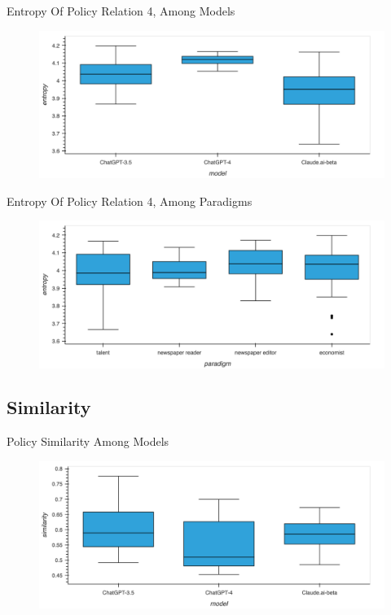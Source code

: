 \documentclass[12pt]{beamer}
\begin{document}
\begin{frame}{Entropy Of Policy Relation 4, Among Models}
\begin{figure}[H]
\centering
\includegraphics[width=11.5cm]{Figures/fig21.png}
\end{figure}
\end{frame}


\begin{frame}{Entropy Of Policy Relation 4, Among Paradigms}
\begin{figure}[H]
\centering
\includegraphics[width=11.5cm]{Figures/fig22.png}
\end{figure}
\end{frame}


\subsection{Similarity}
\begin{frame}{Policy Similarity Among Models}
\begin{figure}[H]
\centering
\includegraphics[width=11.5cm]{Figures/fig23.png}
\end{figure}
\end{frame}
\end{document}
